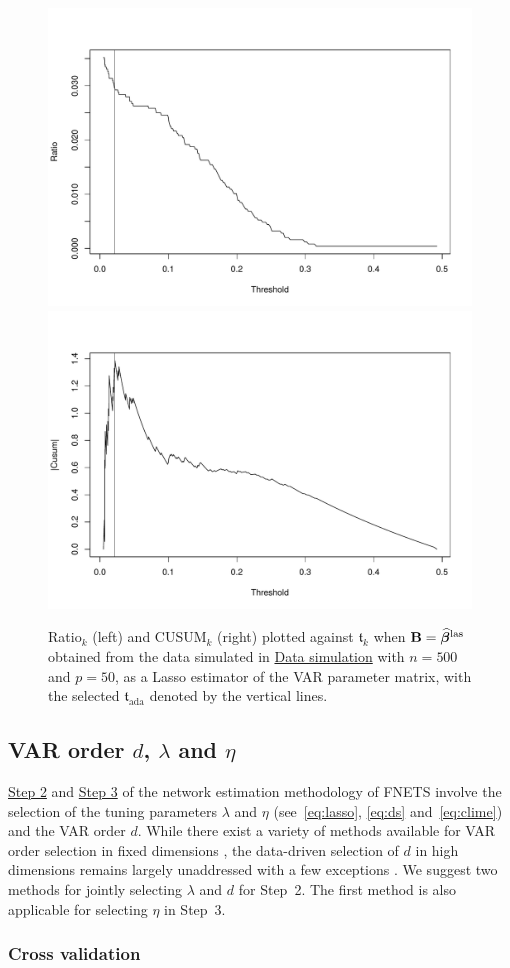 \begin{figure}[hbp]
\centering
\includegraphics[width = .4\textwidth]{figs/threshold1.pdf}
\includegraphics[width = .4\textwidth]{figs/threshold2.pdf}
\caption{Ratio$_k$ (left) and CUSUM$_k$ (right) plotted against $\mathfrak{t}_k$ when $\mathbf B = \widehat{\bm\beta}^{\text{\upshape{las}}}$ obtained from the data simulated in \hyperref[sec:package:data]{Data simulation} with $n = 500$ and $p = 50$, as a Lasso estimator of the VAR parameter matrix, with the selected $\mathfrak{t}_{\text{ada}}$ denoted by the vertical lines.}
\label{fig:thresh}
\end{figure}

\subsection{VAR order $d$, $\lambda$ and $\eta$}
\label{sec:order:lambda}

\hyperref[sec:step:two]{Step 2} and \hyperref[sec:step:three]{Step 3} of the network estimation methodology of FNETS 
involve the selection of the tuning parameters $\lambda$ and $\eta$ (see~\eqref{eq:lasso}, \eqref{eq:ds} and~\eqref{eq:clime}) and the VAR order $d$.
While there exist a variety of methods available for VAR order selection in fixed dimensions \citep[Chapter~4]{lutk}, the data-driven selection of $d$ in high dimensions remains largely unaddressed with a few exceptions \citep{nicholson2020high, krampe2021, zheng2022interpretable}.
We suggest two methods for jointly selecting $\lambda$ and $d$ for Step~2.
The first method is also applicable for selecting $\eta$ in Step~3.

\subsubsection{Cross validation}
\label{sec:tuning:cv}


